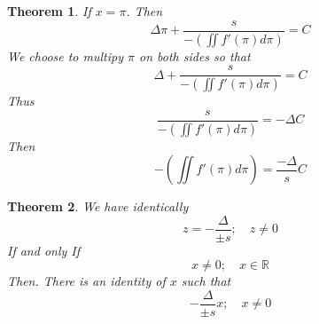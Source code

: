 \documentclass[11pt, a4paper]{article}
\theoremstyle{plain}
\newtheorem{theorem}{Theorem}[section]
\theoremstyle{definition}
\theoremstyle{remark}
\begin{document}
\begin{theorem}
If $x=\pi$. Then
\begin{equation}
  \Delta \pi + \frac{s}{-(\iint f'(\pi) d\pi)} = C
\end{equation}
We choose to multipy $\pi$ on both sides so that
\begin{equation}
  \Delta + \frac{s}{-(\iint f'(\pi) d\pi)} = C
\end{equation}
Thus
\begin{equation}
  \frac{s}{-(\iint f'(\pi) d\pi)} = -\Delta C
\end{equation}
Then
\begin{equation}
  -(\iint f'(\pi) d\pi) = \frac{-\Delta}{s} C
\end{equation}
\end{theorem}

\begin{theorem}
We have identically
\begin{equation}
  z = -\frac{\Delta}{\pm s}; \quad z \neq 0
\end{equation}
If and only If
\begin{equation}
  x \neq 0; \quad x \in \mathbb{R}
\end{equation}
Then. There is an identity of $x$ such that
\begin{equation}
  -\frac{\Delta}{\pm s}x; \quad x \neq 0
\end{equation}
\end{theorem}
\end{document}
